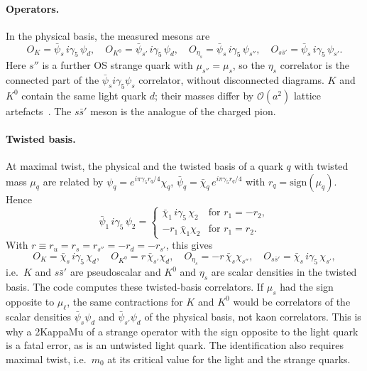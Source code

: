 \paragraph{Operators.}
In the physical basis, the measured mesons are~\cite{Ottnad:2015hva}
\begin{equation}
  O_{K} = \bar\psi_s\,i\gamma_5\,\psi_d , \quad
  O_{K^0} = \bar\psi_{s'}\,i\gamma_5\,\psi_d , \quad
  O_{\eta_s} = \bar\psi_s\,i\gamma_5\,\psi_{s''} , \quad
  O_{s\bar s'} = \bar\psi_s\,i\gamma_5\,\psi_{s'} .
\end{equation}
Here $s''$ is a further OS strange quark with $\mu_{s''}=\mu_s$, so the $\eta_s$ correlator is the
connected part of the $\bar\psi_s i\gamma_5\psi_s$ correlator, without disconnected diagrams.
$K$ and $K^0$ contain the same light quark $d$; their masses differ by
$\mathcal{O}(a^2)$ lattice artefacts~\cite{Ottnad:2015hva}.
The $s\bar s'$ meson is the analogue of the charged pion.

\paragraph{Twisted basis.}
At maximal twist, the physical and the twisted basis of a quark $q$ with twisted mass $\mu_q$ are related by
$\psi_q = e^{i\pi\gamma_5 r_q/4}\chi_q$, $\bar\psi_q = \bar\chi_q\, e^{i\pi\gamma_5 r_q/4}$
with $r_q=\mathrm{sign}(\mu_q)$. Hence
\begin{equation}
  \bar\psi_1\, i\gamma_5\, \psi_2 =
  \begin{cases}
    \bar\chi_1\, i\gamma_5\, \chi_2 & \text{for } r_1=-r_2 , \\
    -r_1\, \bar\chi_1 \chi_2 & \text{for } r_1=r_2 .
  \end{cases}
\end{equation}
With $r\equiv r_u=r_s=r_{s''}=-r_d=-r_{s'}$, this gives
\begin{equation}
  O_{K} = \bar\chi_s\,i\gamma_5\,\chi_d , \quad
  O_{K^0} = r\,\bar\chi_{s'}\chi_d , \quad
  O_{\eta_s} = -r\,\bar\chi_s\chi_{s''} , \quad
  O_{s\bar s'} = \bar\chi_s\,i\gamma_5\,\chi_{s'} ,
\end{equation}
i.e.\ $K$ and $s\bar s'$ are pseudoscalar and $K^0$ and $\eta_s$ are scalar densities in the twisted basis.
The code computes these twisted-basis correlators. If $\mu_s$ had the sign opposite to $\mu_\ell$,
the same contractions for $K$ and $K^0$ would be correlators of the scalar densities
$\bar\psi_s\psi_d$ and $\bar\psi_{s'}\psi_d$ of the physical basis, not kaon correlators.
This is why a {\ttfamily 2KappaMu} of a strange operator with the sign opposite to the light quark
is a fatal error, as is an untwisted light quark.
The identification also requires maximal twist, i.e.\ $m_0$ at its critical value for the light and the strange quarks.

